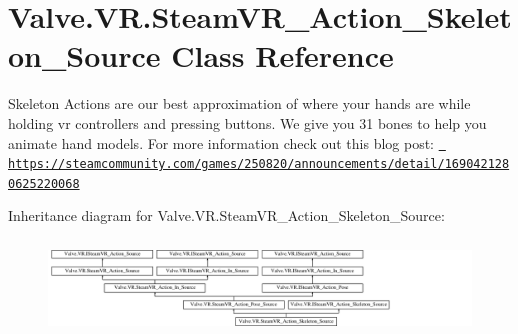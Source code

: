\hypertarget{class_valve_1_1_v_r_1_1_steam_v_r___action___skeleton___source}{}\section{Valve.\+V\+R.\+Steam\+V\+R\+\_\+\+Action\+\_\+\+Skeleton\+\_\+\+Source Class Reference}
\label{class_valve_1_1_v_r_1_1_steam_v_r___action___skeleton___source}


Skeleton Actions are our best approximation of where your hands are while holding vr controllers and pressing buttons. We give you 31 bones to help you animate hand models. For more information check out this blog post\+: \href{https://steamcommunity.com/games/250820/announcements/detail/1690421280625220068}{\texttt{ https\+://steamcommunity.\+com/games/250820/announcements/detail/1690421280625220068}}  


Inheritance diagram for Valve.\+V\+R.\+Steam\+V\+R\+\_\+\+Action\+\_\+\+Skeleton\+\_\+\+Source\+:\begin{figure}[H]
\begin{center}
\leavevmode
\includegraphics[height=2.517986cm]{class_valve_1_1_v_r_1_1_steam_v_r___action___skeleton___source}
\end{center}
\end{figure}
